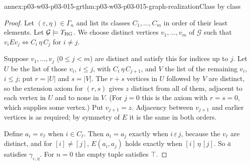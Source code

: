 \begin{annexitem}{annex:p03-w03-p03-015-gr}{thm:p03-w03-p03-015-graph-realization}{Class by class}
\begin{proof}
Let \((\varepsilon,\eta)\in\Gamma_n\) and list its classes
\(C_1,\ldots,C_m\) in order of their least elements. Let
\(\mathcal G\models T_{\rm RG}\). We choose distinct vertices
\(v_1,\ldots,v_m\) of \(\mathcal G\) such that
\(v_iEv_j\Leftrightarrow C_i\,\eta\,C_j\) for \(i\neq j\).

Suppose \(v_1,\ldots,v_j\) (\(0\leq j<m\)) are distinct and satisfy this
for indices up to \(j\). Let \(U\) be the list of those \(v_i\), \(i\leq j\),
with \(C_i\,\eta\,C_{j+1}\), and \(V\) the list of the remaining
\(v_i\), \(i\leq j\); put \(r=|U|\) and \(s=|V|\). The \(r+s\) vertices
in \(U\) followed by \(V\) are distinct, so the extension axiom for
\((r,s)\) gives \(z\) distinct from all of them, adjacent to each vertex
in \(U\) and to none in \(V\). (For \(j=0\) this is the axiom with
\(r=s=0\), which supplies some vertex.) Put \(v_{j+1}=z\). Adjacency
between \(v_{j+1}\) and earlier vertices is as required; by symmetry of
\(E\) it is the same in both orders.

Define \(a_i=v_\ell\) when \(i\in C_\ell\). Then \(a_i=a_j\) exactly when
\(i\,\varepsilon\,j\), because the \(v_\ell\) are distinct, and for
\([i]\neq[j]\), \(E(a_i,a_j)\) holds exactly when \([i]\,\eta\,[j]\).
So \(\bar a\) satisfies \(\gamma_{\varepsilon,\eta}\). For \(n=0\) the
empty tuple satisfies \(\top\).
\end{proof}
\end{annexitem}

